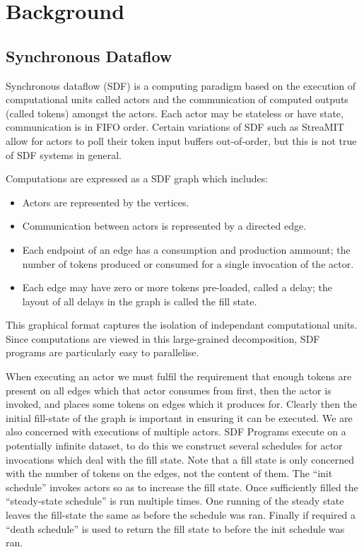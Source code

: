 \section{Background}
\subsection{Synchronous Dataflow}
Synchronous dataflow (SDF) is a computing paradigm based on the execution of computational units called actors and the communication of computed outputs (called tokens) amongst the actors.
Each actor may be stateless or have state, communication is in FIFO order.
Certain variations of SDF such as StreaMIT \cite{thies02} allow for actors to poll their token input buffers out-of-order, but this is not true of SDF systems in general.

Computations are expressed as a SDF graph which includes:
\begin{itemize}
	\item Actors are represented by the vertices.
	\item Communication between actors is represented by a directed edge.
	\item Each endpoint of an edge has a consumption and production ammount; the number of tokens produced or consumed for a single invocation of the actor.
	\item Each edge may have zero or more tokens pre-loaded, called a delay; the layout of all delays in the graph is called the fill state.
\end{itemize}
This graphical format captures the isolation of independant computational units.
Since computations are viewed in this large-grained decomposition, SDF programs are particularly easy to parallelise.

When executing an actor we must fulfil the requirement that enough tokens are present on all edges which that actor consumes from first, then the actor is invoked, and places some tokens on edges which it produces for.
Clearly then the initial fill-state of the graph is important in ensuring it can be executed.
We are also concerned with executions of multiple actors.
SDF Programs execute on a potentially infinite dataset, to do this we construct several schedules for actor invocations which deal with the fill state.
Note that a fill state is only concerned with the number of tokens on the edges, not the content of them.
The ``init schedule'' invokes actors so as to increase the fill state.
Once sufficiently filled the ``steady-state schedule'' is run multiple times.
One running of the steady state leaves the fill-state the same as before the schedule was ran.
Finally if required a ``death schedule'' is used to return the fill state to before the init schedule was ran.

